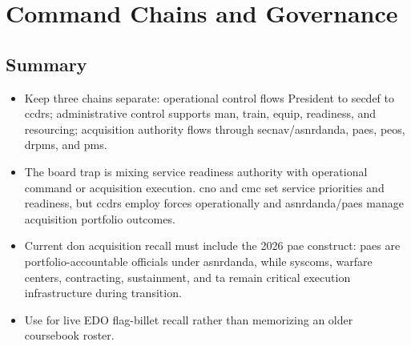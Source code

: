 \documentclass[../main.tex]{subfiles}
\begin{document}
\section{Command Chains and Governance}

\subsection{Summary}
\begin{itemize}
  \item Keep three chains separate: operational control flows President to \ac{secdef} to \acp{ccdr}; administrative control supports man, train, equip, readiness, and resourcing; acquisition authority flows through \ac{secnav}/\ac{asnrdanda}, \acp{pae}, \acp{peo}, \acp{drpm}, and \acp{pm}.
  \item The board trap is mixing service readiness authority with operational command or acquisition execution. \ac{cno} and \ac{cmc} set service priorities and readiness, but \acp{ccdr} employ forces operationally and \ac{asnrdanda}/\acp{pae} manage acquisition portfolio outcomes.
  \item Current \ac{don} acquisition recall must include the 2026 \ac{pae} construct: \acp{pae} are portfolio-accountable officials under \ac{asnrdanda}, while \acp{syscom}, warfare centers, contracting, sustainment, and \ac{ta} remain critical execution infrastructure during transition.
  \item Use \App{\ref{app:edo-flags}} for live EDO flag-billet recall rather than memorizing an older coursebook roster.
\end{itemize}
\end{document}
